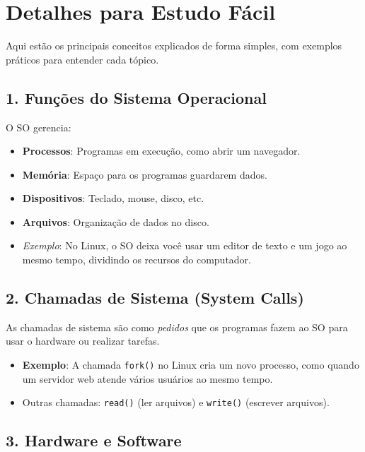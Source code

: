 \documentclass[a4paper,12pt]{article}
\begin{document}
\section*{Detalhes para Estudo Fácil}

Aqui estão os principais conceitos explicados de forma simples, com exemplos práticos para entender cada tópico.

\subsection*{1. Funções do Sistema Operacional}

O SO gerencia:

\begin{itemize}
    \item \textbf{Processos}: Programas em execução, como abrir um navegador.
    \item \textbf{Memória}: Espaço para os programas guardarem dados.
    \item \textbf{Dispositivos}: Teclado, mouse, disco, etc.
    \item \textbf{Arquivos}: Organização de dados no disco.

    \item[] \textit{Exemplo}: No Linux, o SO deixa você usar um editor de texto e um jogo ao mesmo tempo, dividindo os recursos do computador.
\end{itemize}

\subsection*{2. Chamadas de Sistema (System Calls)}

As chamadas de sistema são como \textit{pedidos} que os programas fazem ao SO para usar o hardware ou realizar tarefas.

\begin{itemize}
    \item \textbf{Exemplo}: A chamada \texttt{fork()} no Linux cria um novo processo, como quando um servidor web atende vários usuários ao mesmo tempo.
    \item Outras chamadas: \texttt{read()} (ler arquivos) e \texttt{write()} (escrever arquivos).
\end{itemize}

\subsection*{3. Hardware e Software}
\end{document}

